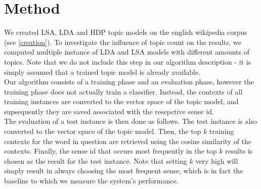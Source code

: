 \section{Method}

\thispagestyle{plain}

We created LSA, LDA and HDP topic models on the english wikipedia corpus (see \ref{creation}). To investigate the influence of topic count on the results, we  computed multiple instance of LDA and LSA models with different amounts of topics. Note that we do not include this step in our algorithm description - it is simply assumed that a trained topic model is already available.\\

Our algorithm consists of a training phase and an evaluation phase, however the training phase does not actually train a classifier. Instead, the contexts of all training instances are converted to the vector space of the topic model, and supsequently they are saved associated with the resepctive sense id.\\
The evaluation of a test instance is then done as follows. The test instance is also converted to the vector space of the topic model. Then, the top $k$ training contexts for the word in question are retrieved using the cosine similarity of the contexts. Finally, the sense id that occurs most frequently in the top $k$ results is chosen as the result for the test instance. Note that setting $k$ very high will simply result in always choosing the most frequent sense, which is in fact the baseline to which we measure the system's performance.\\



%

